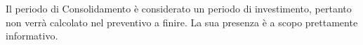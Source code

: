 Il periodo di Consolidamento è considerato un periodo di investimento, pertanto non verrà calcolato nel preventivo a finire. La sua presenza è a scopo prettamente informativo.
